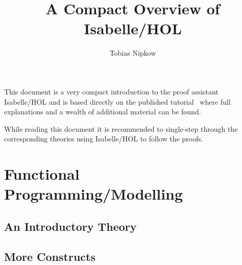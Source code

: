 \documentclass[11pt,a4paper]{article}
\begin{document}
\title{A Compact Overview of Isabelle/HOL}
\author{Tobias Nipkow}
\date{}
\maketitle

\noindent
This document is a very compact introduction to the proof assistant
Isabelle/HOL and is based directly on the published tutorial~\cite{LNCS2283}
where full explanations and a wealth of additional material can be found.

While reading this document it is recommended to single-step through the
corresponding theories using Isabelle/HOL to follow the proofs.

\section{Functional Programming/Modelling}

\subsection{An Introductory Theory}


\subsection{More Constructs}










%





\end{document}
